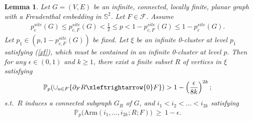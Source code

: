\documentclass[11pt]{amsart}
\theoremstyle{plain}
\newtheorem{lemma}[theorem]{Lemma}
\numberwithin{equation}{section}
\numberwithin{figure}{section}
\newcommand\PP{{\mathbb P}}
\newcommand\eps{\epsilon}
\begin{document}
\begin{lemma}\label{l27}
Let $G=(V,E)$ be an infinite, connected, locally finite, planar graph with a Freudenthal embedding in $\mathbb{S}^2$. Let $F\in \mathcal{F}$. Assume 
\begin{align*}
p_c^{site}(G)\le p_{c,F}^{site}(G)<\frac{1}{2}\leq p<1-p_{c,F}^{site}(G)\le 1-p_c^{site}(G). 
\end{align*}
Let $p_1\in \left(p,1-p_{c,F}^{site}(G)\right)$ be fixed. Let $\xi$ be an infinite 0-cluster at level $p_1$ satisfying (\ref{xf}), which must be contained in an infinite 0-cluster at level $p$. Then for any $\epsilon\in(0,1)$ and $k\geq 1$, there exist a finite subset $R$ of vertices in $\xi$ satisfying
\begin{align}
\PP_{p}(\cup_{a\in F}\{\partial_FR\xleftrightarrow{0}F\})>1-\left(\frac{\epsilon}{8k}\right)^{2k};\label{rcif}
\end{align}
s.t.~$R$ induces a connected subgraph $G_{R}$ of $G$, and $i_1<i_2<\ldots<i_{2k}$ satisfying
\begin{align}
\PP_p\!\big(\mathrm{Arm}(i_1,\ldots,i_{2k};R;F)\big)\ \ge\ 1-\eps.\label{alb1}
\end{align}
\end{lemma}
\end{document}
